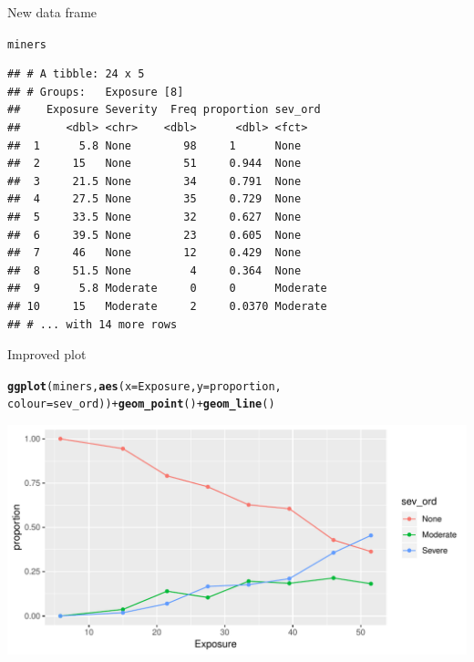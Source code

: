 \documentclass[unknownkeysallowed]{beamer}\usepackage[]{graphicx}\usepackage[]{color}
\makeatletter
\def\maxwidth{ %
  \ifdim\Gin@nat@width>\linewidth
    \linewidth
  \else
    \Gin@nat@width
  \fi
}
\newcommand{\hlopt}[1]{\textcolor[rgb]{0,0,0}{#1}}%
\newcommand{\hlstd}[1]{\textcolor[rgb]{0.345,0.345,0.345}{#1}}%
\newcommand{\hlkwc}[1]{\textcolor[rgb]{0.333,0.667,0.333}{#1}}%
\newcommand{\hlkwd}[1]{\textcolor[rgb]{0.737,0.353,0.396}{\textbf{#1}}}%
\newenvironment{kframe}{%
 \def\at@end@of@kframe{}%
 \ifinner\ifhmode%
  \def\at@end@of@kframe{\end{minipage}}%
  \begin{minipage}{\columnwidth}%
 \fi\fi%
 \def\FrameCommand##1{\hskip\@totalleftmargin \hskip-\fboxsep
 \colorbox{shadecolor}{##1}\hskip-\fboxsep
     \hskip-\linewidth \hskip-\@totalleftmargin \hskip\columnwidth}%
 \MakeFramed {\advance\hsize-\width
   \@totalleftmargin\z@ \linewidth\hsize
   \@setminipage}}%
 {\par\unskip\endMakeFramed%
 \at@end@of@kframe}
\newenvironment{knitrout}{}{} %
\makeatother
\begin{document}
\begin{frame}[fragile]{New data frame}

\begin{knitrout}
\color{fgcolor}\begin{kframe}
\begin{alltt}
\hlstd{miners}
\end{alltt}
\begin{verbatim}
## # A tibble: 24 x 5
## # Groups:   Exposure [8]
##    Exposure Severity  Freq proportion sev_ord 
##       <dbl> <chr>    <dbl>      <dbl> <fct>   
##  1      5.8 None        98     1      None    
##  2     15   None        51     0.944  None    
##  3     21.5 None        34     0.791  None    
##  4     27.5 None        35     0.729  None    
##  5     33.5 None        32     0.627  None    
##  6     39.5 None        23     0.605  None    
##  7     46   None        12     0.429  None    
##  8     51.5 None         4     0.364  None    
##  9      5.8 Moderate     0     0      Moderate
## 10     15   Moderate     2     0.0370 Moderate
## # ... with 14 more rows
\end{verbatim}
\end{kframe}
\end{knitrout}
  
\end{frame}


\begin{frame}[fragile]{Improved plot}
  
\begin{knitrout}\small
{}\color{fgcolor}\begin{kframe}
\begin{alltt}
\hlkwd{ggplot}\hlstd{(miners,}\hlkwd{aes}\hlstd{(}\hlkwc{x}\hlstd{=Exposure,}\hlkwc{y}\hlstd{=proportion,}
    \hlkwc{colour}\hlstd{=sev_ord))}\hlopt{+}\hlkwd{geom_point}\hlstd{()}\hlopt{+}\hlkwd{geom_line}\hlstd{()}
\end{alltt}
\end{kframe}
\includegraphics[width=\maxwidth]{figure/unnamed-chunk-85-1} 

\end{knitrout}
   
  
\end{frame}
\end{document}
